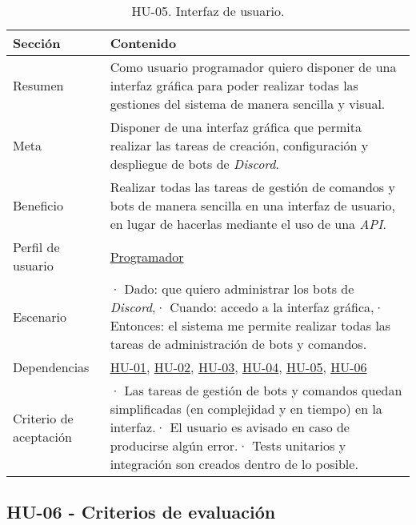\begin{table}[H]
    \centering
    \def\arraystretch{1.25}
    \begin{adjustbox}{max width=\textwidth}
    \begin{tabularx}{\textwidth}{|l|L|}
    \hline
        \textbf{Sección} & \textbf{Contenido} \\ \hline
    \hline
        Resumen & Como usuario programador quiero disponer de una interfaz gráfica para poder realizar todas las gestiones del sistema de manera sencilla y visual. \\ \hline
        Meta & Disponer de una interfaz gráfica que permita realizar las tareas de creación, configuración y despliegue de bots de \textit{Discord}. \\ \hline
        Beneficio & Realizar todas las tareas de gestión de comandos y bots de manera sencilla en una interfaz de usuario, en lugar de hacerlas mediante el uso de una \textit{API}. \\ \hline
        Perfil de usuario & \hyperref[sec:personaProgramador]{Programador} \\ \hline
        Escenario & · Dado: que quiero administrar los bots de \textit{Discord},\linebreak · Cuando: accedo a la interfaz gráfica,\linebreak · Entonces: el sistema me permite realizar todas las tareas de administración de bots y comandos. \\ \hline
        Dependencias & \hyperref[sec:hu01]{HU-01}, \hyperref[sec:hu02]{HU-02}, \hyperref[sec:hu03]{HU-03}, \hyperref[sec:hu04]{HU-04}, \hyperref[sec:hu05]{HU-05}, \hyperref[sec:hu06]{HU-06} \\ \hline
        Criterio de aceptación & · Las tareas de gestión de bots y comandos quedan simplificadas (en complejidad y en tiempo) en la interfaz.\linebreak · El usuario es avisado en caso de producirse algún error.\linebreak · Tests unitarios y integración son creados dentro de lo posible. \\ \hline
    \end{tabularx}
    \end{adjustbox}
    \caption{HU-05. Interfaz de usuario.}
\end{table}

\subsection{HU-06 - Criterios de evaluación}
\label{sec:hu06}

